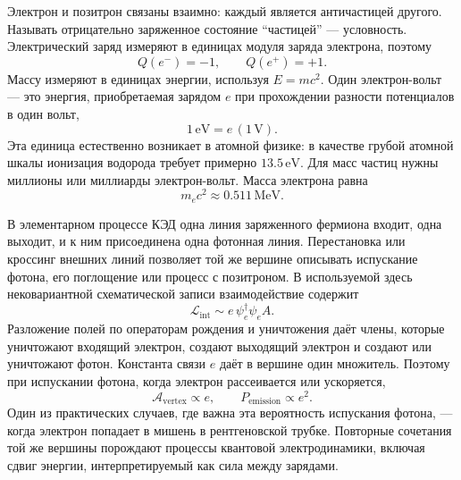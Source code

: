 Электрон и позитрон связаны взаимно: каждый является античастицей другого. Называть отрицательно заряженное состояние ``частицей'' — условность. Электрический заряд измеряют в единицах модуля заряда электрона, поэтому
\begin{equation}
Q(e^-)=-1,\qquad Q(e^+)=+1.
\end{equation}
Массу измеряют в единицах энергии, используя \(E=mc^2\). Один электрон-вольт — это энергия, приобретаемая зарядом \(e\) при прохождении разности потенциалов в один вольт,
\begin{equation}
1\,\mathrm{eV}=e\,(1\,\mathrm V).
\end{equation}
Эта единица естественно возникает в атомной физике: в качестве грубой атомной шкалы ионизация водорода требует примерно \(13.5\,\mathrm{eV}\). Для масс частиц нужны миллионы или миллиарды электрон-вольт. Масса электрона равна
\begin{equation}
m_e c^2 \approx 0.511\,\mathrm{MeV}.
\end{equation}

\begin{classroomqa}
\end{classroomqa}

В элементарном процессе КЭД одна линия заряженного фермиона входит, одна выходит, и к ним присоединена одна фотонная линия. Перестановка или кроссинг внешних линий позволяет той же вершине описывать испускание фотона, его поглощение или процесс с позитроном. В используемой здесь нековариантной схематической записи взаимодействие содержит
\begin{equation}
\mathcal{L}_{\mathrm{int}}\sim e\,\psi_e^\dagger \psi_e A.
\end{equation}
Разложение полей по операторам рождения и уничтожения даёт члены, которые уничтожают входящий электрон, создают выходящий электрон и создают или уничтожают фотон. Константа связи \(e\) даёт в вершине один множитель. Поэтому при испускании фотона, когда электрон рассеивается или ускоряется,
\begin{equation}
\mathcal{A}_{\mathrm{vertex}}\propto e,
\qquad
P_{\mathrm{emission}}\propto e^2.
\end{equation}
Один из практических случаев, где важна эта вероятность испускания фотона, — когда электрон попадает в мишень в рентгеновской трубке. Повторные сочетания той же вершины порождают процессы квантовой электродинамики, включая сдвиг энергии, интерпретируемый как сила между зарядами.

